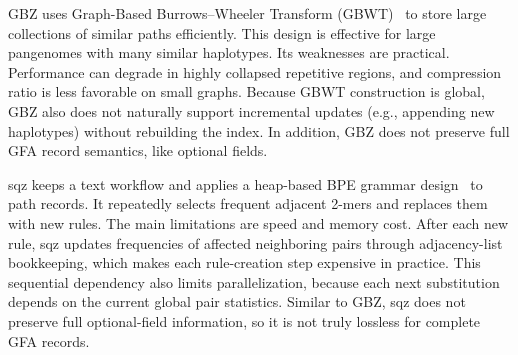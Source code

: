 GBZ uses Graph-Based Burrows–Wheeler Transform (GBWT)~\cite{siren2020haplotype, siren2021pangenomics} to store large collections of similar paths efficiently. This design is effective for large pangenomes with many similar haplotypes.
Its weaknesses are practical. Performance can degrade in highly collapsed repetitive regions, and compression ratio is less favorable on small graphs. Because GBWT construction is global, GBZ also does not naturally support incremental updates (e.g., appending new haplotypes) without rebuilding the index. In addition, GBZ does not preserve full GFA record semantics, like optional fields.

sqz keeps a text workflow and applies a heap-based BPE grammar design~\cite{zouhar2023formal} to path records. It repeatedly selects frequent adjacent 2-mers and replaces them with new rules.
The main limitations are speed and memory cost. After each new rule, sqz updates frequencies of affected neighboring pairs through adjacency-list bookkeeping, which makes each rule-creation step expensive in practice. This sequential dependency also limits parallelization, because each next substitution depends on the current global pair statistics. Similar to GBZ, sqz does not preserve full optional-field information, so it is not truly lossless for complete GFA records.
